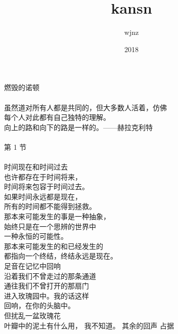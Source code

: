 \documentclass{article}
\title{kansn}
\author{wjnz}
\date{2018}
\begin{document}

\maketitle

\setlength\parindent{0pt}


\Large

﻿燃毁的诺顿 \\
 \\
虽然道对所有人都是共同的，但大多数人活着，仿佛 \\
每个人对此都有自己独特的理解。 \\
向上的路和向下的路是一样的。——赫拉克利特 \\
 \\
第 1 节 \\
 \\
时间现在和时间过去 \\
也许都存在于时间将来， \\
时间将来包容于时间过去。 \\
如果时间永远都是现在， \\
所有的时间都不能得到拯救。 \\
那本来可能发生的事是一种抽象， \\
始终只是在一个思辨的世界中 \\
一种永恒的可能性。 \\
那本来可能发生的和已经发生的 \\
都指向一个终结，终结永远是现在。 \\
足音在记忆中回响 \\
沿着我们不曾走过的那条通道 \\
通往我们不曾打开的那扇门 \\
进入玫瑰园中。我的话这样 \\
回响，在你的头脑中。 \\
但扰乱一盆玫瑰花 \\
叶瓣中的泥土有什么用，
我不知道。
其余的回声
占据

\newpage 
\end{document}
